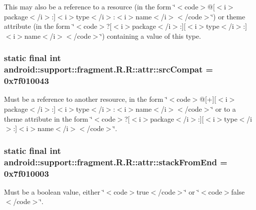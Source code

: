 This may also be a reference to a resource (in the form \char`\"{}$<$code$>$@\mbox{[}$<$i$>$package$<$/i$>$:\mbox{]}$<$i$>$type$<$/i$>$:$<$i$>$name$<$/i$>$$<$/code$>$\char`\"{}) or theme attribute (in the form \char`\"{}$<$code$>$?\mbox{[}$<$i$>$package$<$/i$>$:\mbox{]}\mbox{[}$<$i$>$type$<$/i$>$:\mbox{]}$<$i$>$name$<$/i$>$$<$/code$>$\char`\"{}) containing a value of this type. \hypertarget{classandroid_1_1support_1_1fragment_1_1_r_1_1attr_062c1034e576678d0afd28d8294f098b}{
\subsubsection[{srcCompat}]{\setlength{\rightskip}{0pt plus 5cm}static final int android::support::fragment.R.R::attr::srcCompat = 0x7f010043}}
\label{classandroid_1_1support_1_1fragment_1_1_r_1_1attr_062c1034e576678d0afd28d8294f098b}


Must be a reference to another resource, in the form \char`\"{}$<$code$>$@\mbox{[}+\mbox{]}\mbox{[}$<$i$>$package$<$/i$>$:\mbox{]}$<$i$>$type$<$/i$>$:$<$i$>$name$<$/i$>$$<$/code$>$\char`\"{} or to a theme attribute in the form \char`\"{}$<$code$>$?\mbox{[}$<$i$>$package$<$/i$>$:\mbox{]}\mbox{[}$<$i$>$type$<$/i$>$:\mbox{]}$<$i$>$name$<$/i$>$$<$/code$>$\char`\"{}. \hypertarget{classandroid_1_1support_1_1fragment_1_1_r_1_1attr_98da596a480752211e698d068188d367}{
\subsubsection[{stackFromEnd}]{\setlength{\rightskip}{0pt plus 5cm}static final int android::support::fragment.R.R::attr::stackFromEnd = 0x7f010003}}
\label{classandroid_1_1support_1_1fragment_1_1_r_1_1attr_98da596a480752211e698d068188d367}


Must be a boolean value, either \char`\"{}$<$code$>$true$<$/code$>$\char`\"{} or \char`\"{}$<$code$>$false$<$/code$>$\char`\"{}. 

